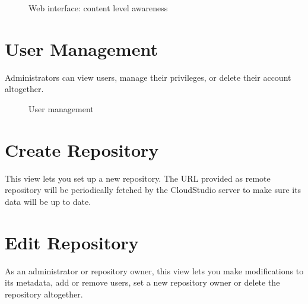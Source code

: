 \begin{figure}[h!]
  \centering
  \caption{Web interface: content level awareness}
  \label{fig:contentlevel}
\end{figure}





\section{User Management}

Administrators can view users, manage their privileges, or delete their account altogether.






\begin{figure}[h!]
  \centering
  \caption{User management}
  \label{fig:manageusers}
\end{figure}





\section{Create Repository}

This view lets you set up a new repository. The URL provided as remote repository will be periodically fetched by the CloudStudio server to make sure its data will be up to date.



\section{Edit Repository}

As an administrator or repository owner, this view lets you make modifications to its metadata, add or remove users, set a new repository owner or delete the repository altogether.

